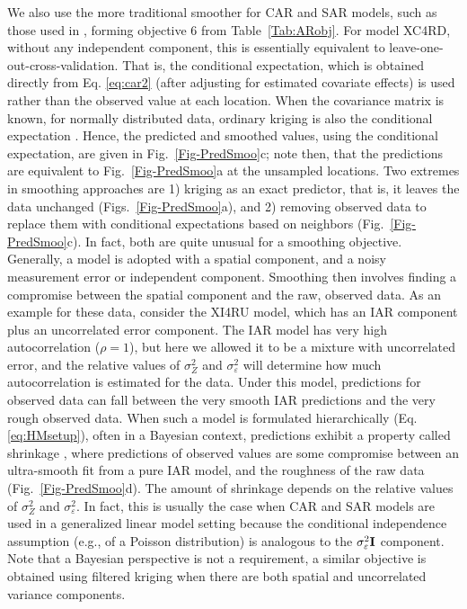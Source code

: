 \documentclass[11pt, titlepage]{article}\usepackage[]{graphicx}\usepackage[]{color}
\begin{document}
\begin{spacing}{1.9}
\begin{flushleft}
We also use the more traditional smoother for CAR and SAR models, such as those used in \citep{Clay:Kald:empi:1987}, forming objective 6 from Table~\ref{Tab:ARobj}.  For model XC4RD, without any independent component, this is essentially equivalent to leave-one-out-cross-validation. That is, the conditional expectation, which is obtained directly from Eq. \ref{eq:car2} (after adjusting for estimated covariate effects) is used rather than the observed value at each location. When the covariance matrix is known, for normally distributed data, ordinary kriging is also the conditional expectation \citep[p. 108, 174]{Cres:stat:1993}.  Hence, the predicted and smoothed values, using the conditional expectation, are given in Fig.~\ref{Fig-PredSmoo}c; note then, that the predictions are equivalent to Fig.~\ref{Fig-PredSmoo}a at the unsampled locations. Two extremes in smoothing approaches are 1) kriging as an exact predictor, that is, it leaves the data unchanged (Figs.~\ref{Fig-PredSmoo}a), and 2) removing observed data to replace them with conditional expectations based on neighbors (Fig.~\ref{Fig-PredSmoo}c).  In fact, both are quite unusual for a smoothing objective. Generally, a model is adopted with a spatial component, and a noisy measurement error or independent component.  Smoothing then involves finding a compromise between the spatial component and the raw, observed data. As an example for these data, consider the XI4RU model, which has an IAR component plus an uncorrelated error component.  The IAR model has very high autocorrelation ($\rho = 1$), but here we allowed it to be a mixture with uncorrelated error, and the relative values of $\sigma_Z^2$ and $\sigma^2_\varepsilon$ will determine how much autocorrelation is estimated for the data.  Under this model, predictions for observed data can fall between the very smooth IAR predictions and the very rough observed data. When such a model is formulated hierarchically (Eq. \ref{eq:HMsetup}), often in a Bayesian context, predictions exhibit a property called shrinkage \citep{Fay:Herr:esti:1979}, where predictions of observed values are some compromise between an ultra-smooth fit from a pure IAR model, and the roughness of the raw data (Fig.~\ref{Fig-PredSmoo}d).  The amount of shrinkage depends on the relative values of $\sigma_Z^2$ and $\sigma^2_\varepsilon$.  In fact, this is usually the case when CAR and SAR models are used in a generalized linear model setting because the conditional independence assumption (e.g., of a Poisson distribution) is analogous to the $\sigma^2_\varepsilon\mathbf{I}$ component.  Note that a Bayesian perspective is not a requirement, a similar objective is obtained using filtered kriging \citep[][pg. 306]{Wall:Gotw:appl:2004} when there are both spatial and uncorrelated variance components.


\end{flushleft}
\end{spacing}
\end{document}

